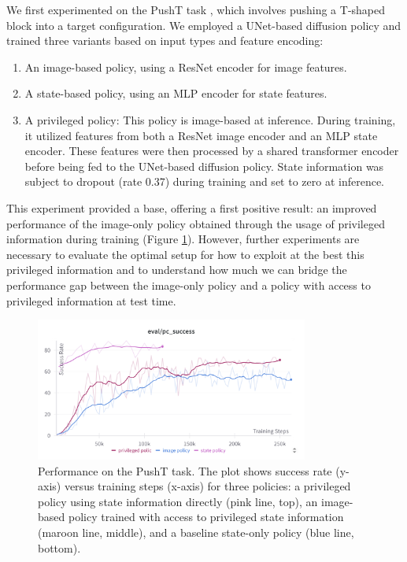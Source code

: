 \documentclass{article}
\begin{document}
 We first experimented on the PushT task \cite{chi2023diffusionpolicy}, which involves pushing a T-shaped block into a target configuration. We employed a UNet-based diffusion policy and trained three variants based on input types and feature encoding:
\begin{enumerate}
    \item An image-based policy, using a ResNet encoder for image features.
    \item A state-based policy, using an MLP encoder for state features.
    \item A privileged policy: This policy is image-based at inference. During training, it utilized features from both a ResNet image encoder and an MLP state encoder. These features were then processed by a shared transformer encoder before being fed to the UNet-based diffusion policy. State information was subject to dropout (rate 0.37) during training and set to zero at inference.
\end{enumerate}
This experiment provided a base, offering a first positive result: an improved performance of the image-only policy obtained through the usage of privileged information during training (Figure \ref{fig:pusht_performance}). However, further experiments are necessary to evaluate the optimal setup for how to exploit at the best this privileged information and to understand how much we can bridge the performance gap between the image-only policy and a policy with access to privileged information at test time.

\begin{figure}[htbp]
    \centering
    \includegraphics[width=0.8\textwidth]{./media/pushT-privileged-training.png}
    \caption{Performance on the PushT task. The plot shows success rate (y-axis) versus training steps (x-axis) for three policies: a privileged policy using state information directly (pink line, top), an image-based policy trained with access to privileged state information (maroon line, middle), and a baseline state-only policy (blue line, bottom).}
    \label{fig:pusht_performance}
\end{figure}
\end{document}
